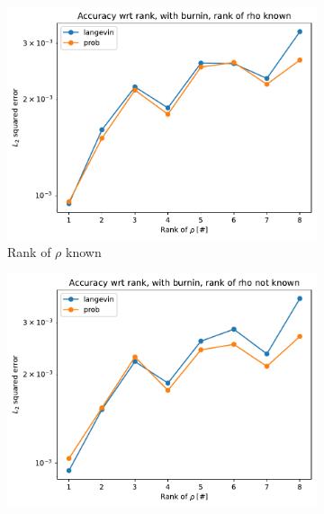 \documentclass[12pt]{memoir}
\begin{document}
\begin{figure}[H]

    \centering

    \begin{subfigure}[b]{0.49\textwidth}


        \centering

        \includegraphics[width=\textwidth]{figures/experiments/rank_info/rank_known-1.png}

        \caption{Rank of $\rho$ known}

        \label{fig:rank-info-sub}

    \end{subfigure}
    \hfill
    \begin{subfigure}[b]{0.49\textwidth}


        \centering

        \includegraphics[width=\textwidth]{figures/experiments/rank_info/rank_not_known-1.png}


\end{subfigure}
\end{figure}
\end{document}

